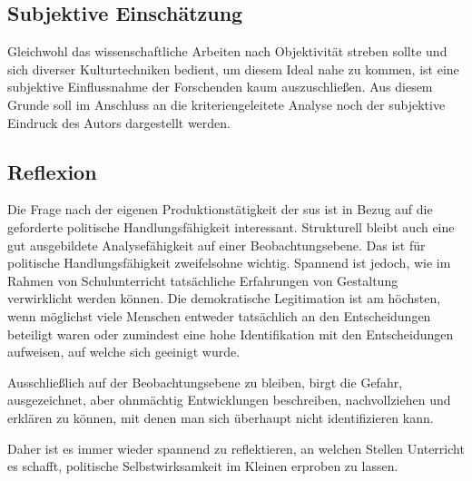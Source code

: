 \subsection{Subjektive Einschätzung}
Gleichwohl das wissenschaftliche Arbeiten nach Objektivität streben sollte und sich diverser Kulturtechniken bedient, um diesem Ideal nahe zu kommen, ist eine subjektive Einflussnahme der Forschenden kaum auszuschließen. Aus diesem Grunde soll im Anschluss an %
die kriteriengeleitete Analyse noch der subjektive Eindruck des Autors dargestellt werden. 

\subsection{Reflexion}
Die Frage nach der eigenen Produktionstätigkeit der \gls{sus} ist in Bezug auf die geforderte politische Handlungsfähigkeit interessant. Strukturell bleibt auch eine gut ausgebildete Analysefähigkeit auf einer Beobachtungsebene. Das ist für politische Handlungsfähigkeit zweifelsohne wichtig. Spannend ist jedoch, wie im Rahmen von Schulunterricht tatsächliche Erfahrungen von Gestaltung verwirklicht werden können. Die demokratische Legitimation ist am höchsten, wenn möglichst viele Menschen entweder tatsächlich an den Entscheidungen beteiligt waren oder zumindest eine hohe Identifikation mit den Entscheidungen aufweisen, auf welche sich geeinigt wurde. 

Ausschließlich auf der Beobachtungsebene zu bleiben, birgt die Gefahr, ausgezeichnet, aber ohnmächtig Entwicklungen beschreiben, nachvollziehen und erklären zu können, mit denen man sich überhaupt nicht identifizieren kann. 

Daher ist es immer wieder spannend zu reflektieren, an welchen Stellen Unterricht es schafft, politische Selbstwirksamkeit im Kleinen erproben zu lassen.  






